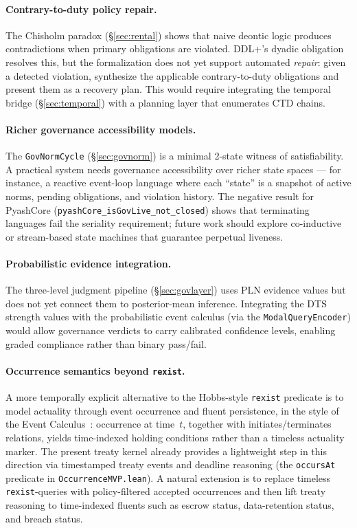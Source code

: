 \documentclass[]{article}
\newcommand{\code}[1]{\texttt{#1}}
\newcommand{\DDL}{\textup{DDL+}}
\newcommand{\DTS}{\textup{DTS}}
\newcommand{\PLN}{\textup{PLN}}
\begin{document}
\paragraph{Contrary-to-duty policy repair.}
The Chisholm paradox (§\ref{sec:rental}) shows that naive deontic logic
produces contradictions when primary obligations are violated.  \DDL{}'s
dyadic obligation resolves this, but the formalization does not yet support
automated \emph{repair}: given a detected violation, synthesize the
applicable contrary-to-duty obligations and present them as a recovery
plan.  This would require integrating the temporal bridge (§\ref{sec:temporal})
with a planning layer that enumerates CTD chains.

\paragraph{Richer governance accessibility models.}
The \code{GovNormCycle} (§\ref{sec:govnorm}) is a minimal 2-state
witness of satisfiability.  A practical system needs governance
accessibility over richer state spaces --- for instance, a reactive
event-loop language where each ``state'' is a snapshot of active
norms, pending obligations, and violation history.  The negative
result for PyashCore (\code{pyashCore\_isGovLive\_not\_closed}) shows
that terminating languages fail the seriality requirement; future
work should explore co-inductive or stream-based state machines
that guarantee perpetual liveness.

\paragraph{Probabilistic evidence integration.}
The three-level judgment pipeline (§\ref{sec:govlayer}) uses
\PLN{} evidence values but does not yet connect them to posterior-mean
inference.  Integrating the \DTS{} strength values with the
probabilistic event calculus (via the \code{ModalQueryEncoder}) would
allow governance verdicts to carry calibrated confidence levels,
enabling graded compliance rather than binary pass/fail.

\paragraph{Occurrence semantics beyond \code{rexist}.}
A more temporally explicit alternative to the Hobbs-style \code{rexist}
predicate is to model actuality through event occurrence and fluent
persistence, in the style of the Event Calculus~\cite{KowalskiSergot1986}:
occurrence at time~$t$, together with initiates/terminates relations, yields
time-indexed holding conditions rather than a timeless actuality marker.  The
present treaty kernel already provides a lightweight step in this direction
via timestamped treaty events and deadline reasoning (the \code{occursAt}
predicate in \code{OccurrenceMVP.lean}).  A natural extension is to replace
timeless \code{rexist}-queries with policy-filtered accepted occurrences and
then lift treaty reasoning to time-indexed fluents such as escrow status,
data-retention status, and breach status.
\end{document}
